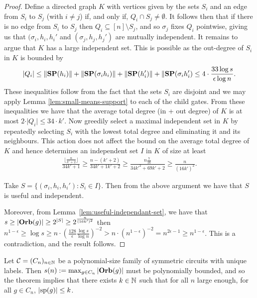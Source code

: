 \documentclass[../paper.tex]{subfiles}
\begin{document}
\begin{proof}
  Define a directed graph $K$ with vertices given by the sets $S_i$ and an edge
  from $S_i$ to $S_j$ (with $i \neq j$) if, and only if, $Q_i \cap S_j \neq
  \emptyset$. It follows then that if there is no edge from $S_i$ to $S_j$ then
  $Q_i \subseteq [n]\setminus S_j$, and so $\sigma_j$ fixes $Q_i$ pointwise,
  giving us that $(\sigma_i, h_i, h_i'$ and $(\sigma_j, h_j, h_j')$ are mutually
  independent. It remains to argue that $K$ has a large independent set. This is
  possible as the out-degree of $S_i$ in $K$ is bounded by
  \begin{align*}
    \vert Q_i \vert \leq \|\text{\textbf{SP}}(h_i) \| + \|\text{\textbf{SP}}(\sigma_i h_i) \| + \|\text{\textbf{SP}}(h_i') \| + \|\text{\textbf{SP}}(\sigma_i h_i') \leq 4 \cdot \frac{33\log s}{\epsilon \log n}.
  \end{align*}
  These inequalities follow from the fact that the sets $S_i$ are disjoint and
  we may apply Lemma \ref{lem:small-means-support} to each of the child gates.
  From these inequalities we have that the average total degree (in + out
  degree) of $K$ is at most $2 \cdot \vert Q_i \vert \leq 34 \cdot k'$. Now
  greedily select a maximal independent set in $K$ by repeatedly selecting $S_i$
  with the lowest total degree and eliminating it and its neighbours. This
  action does not affect the bound on the average total degree of $K$ and hence
  determines an independent set $I$ in $K$ of size at least
  \begin{align*}
    \frac{\lfloor \frac{n}{k' + 2} \rfloor}{34k' + 1} \geq \frac{n - (k'+2)}{34k'+1k'+2} \geq \frac{n\frac{7}{16}}{34k'^2 + 69k' +2} \geq \frac{n}{(16k')^2}.
  \end{align*}

  Take $S = \{(\sigma_i, h_i, h_i') : S_i \in I \}$. Then from the above
  argument we have that $S$ is useful and independent.
  
  Moreover, from Lemma~\ref{lem:useful-independant-set}, we have that $s \geq
  \vert \text{\textbf{Orb}}(g) \vert \geq 2^{\vert S \vert} \geq 2^{\frac{n}{(16k')^2}}$ then
  $n^{1-\epsilon} \geq \log s \geq n \cdot (\frac{128}{\epsilon}\frac{\log s}{\log n})^{-2} > n \cdot (n^{1-\epsilon})^{-2} = n^{2\epsilon -1} \geq
  n^{1-\epsilon}$. This is a contradiction, and the result follows.
\end{proof}
 
Let $\mathcal{C} = (C_n)_{n \in \mathbb{N}}$ be a polynomial-size family of symmetric
circuits with unique labels. Then $s(n) := \max_{g \in C_n} \vert \text{\textbf{Orb}} (g)\vert$
must be polynomially bounded, and so the theorem implies that there exists $k
\in \mathbb{N}$ such that for all $n$ large enough, for all $g \in C_n$, $\vert
\text{sp}(g) \vert \leq k$.
\end{document}
